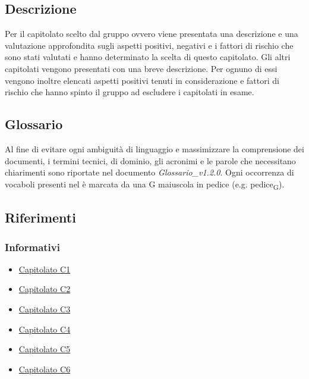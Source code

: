 \documentclass[12pt,a4paper]{article}
\begin{document}
\subsection{Descrizione}
Per il capitolato scelto dal gruppo ovvero  viene presentata una descrizione e una valutazione approfondita sugli aspetti positivi, negativi e i fattori di rischio che sono stati valutati e hanno determinato la scelta di questo capitolato. Gli altri capitolati vengono presentati con una breve descrizione. Per ognuno di essi vengono inoltre elencati aspetti positivi tenuti in considerazione e fattori di rischio che hanno spinto il gruppo ad escludere i capitolati in esame.

\subsection{Glossario}
Al fine di evitare ogni ambiguità di linguaggio e massimizzare la comprensione dei
documenti, i termini tecnici, di dominio, gli acronimi e le parole che necessitano chiarimenti sono riportate nel documento \emph{Glossario\_v1.2.0}. Ogni occorrenza di vocaboli presenti nel \GL è marcata da una G maiuscola in pedice (e.g. pedice\textsubscript{G}).

\subsection{Riferimenti}
\subsubsection{Informativi}

\begin{itemize}
\item \href{http://www.math.unipd.it/~tullio/IS-1/2015/Progetto/C1.pdf}{Capitolato C1}
\item \href{http://www.math.unipd.it/~tullio/IS-1/2015/Progetto/C2.pdf}{Capitolato C2}
\item \href{http://www.math.unipd.it/~tullio/IS-1/2015/Progetto/C3.pdf}{Capitolato C3}
\item \href{http://www.math.unipd.it/~tullio/IS-1/2015/Progetto/C4.pdf}{Capitolato C4}
\item \href{http://www.math.unipd.it/~tullio/IS-1/2015/Progetto/C5.pdf}{Capitolato C5}
\item \href{http://www.math.unipd.it/~tullio/IS-1/2015/Progetto/C6.pdf}{Capitolato C6}
\end{itemize}
\end{document}
